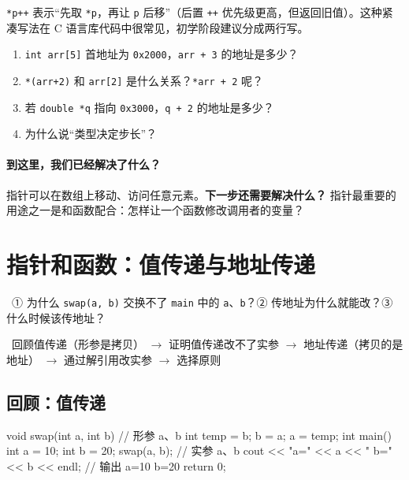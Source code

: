 \documentclass[UTF8,a4paper,11pt,fontset=none,zihao=-4]{ctexart}
\newcommand{\ci}[1]{{\circfont #1}}
\newcommand{\cc}[1]{\texttt{#1}}
\begin{document}
\begin{extendbox}
\cc{*p++} 表示“先取 \cc{*p}，再让 \cc{p} 后移”（后置 \cc{++} 优先级更高，但返回旧值）。这种紧凑写法在 C 语言库代码中很常见，初学阶段建议分成两行写。
\end{extendbox}

\begin{checkbox}
\begin{enumerate}[label=\arabic*.,itemsep=0pt]
  \item \cc{int arr[5]} 首地址为 \cc{0x2000}，\cc{arr + 3} 的地址是多少？
  \item \cc{*(arr+2)} 和 \cc{arr[2]} 是什么关系？\cc{*arr + 2} 呢？
  \item 若 \cc{double *q} 指向 \cc{0x3000}，\cc{q + 2} 的地址是多少？
  \item 为什么说“类型决定步长”？
\end{enumerate}
\end{checkbox}

\paragraph{到这里，我们已经解决了什么？} 指针可以在数组上移动、访问任意元素。\textbf{下一步还需要解决什么？} 指针最重要的用途之一是和函数配合：怎样让一个函数修改调用者的变量？

\section{指针和函数：值传递与地址传递}\label{sec:func}
\ \ci{①} 为什么 \cc{swap(a, b)} 交换不了 \cc{main} 中的 \cc{a}、\cc{b}？\ci{②} 传地址为什么就能改？\ci{③} 什么时候该传地址？\par
{}\ 回顾值传递（形参是拷贝） $\to$ 证明值传递改不了实参 $\to$ 地址传递（拷贝的是地址） $\to$ 通过解引用改实参 $\to$ 选择原则

\subsection{回顾：值传递}
\begin{examplebox}
\begin{code}
void swap(int a, int b)       // 形参 a、b
{
    int temp = b;
    b = a;
    a = temp;
}
int main()
{
    int a = 10;
    int b = 20;
    swap(a, b);               // 实参 a、b
    cout << "a=" << a << " b=" << b << endl;   // 输出 a=10 b=20
    return 0;
}
\end{code}
\end{examplebox}
\end{document}

